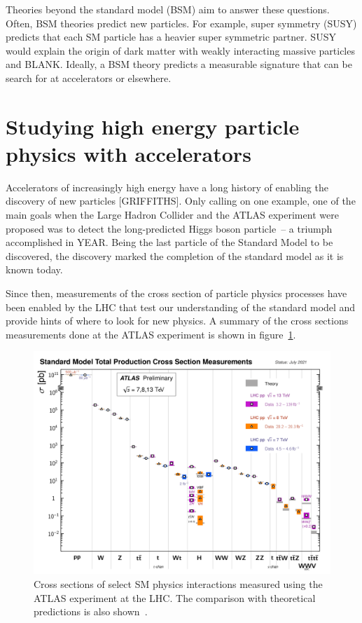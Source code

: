 Theories beyond the standard model (BSM) aim to answer these questions. Often, BSM theories predict new particles. For example, super symmetry (SUSY) predicts that each SM particle has a heavier super symmetric partner. SUSY would explain the origin of dark matter with weakly interacting massive particles and BLANK. Ideally, a BSM theory predicts a measurable signature that can be search for at accelerators or elsewhere.

\section{Studying high energy particle physics with accelerators}

Accelerators of increasingly high energy have a long history of enabling the discovery of new particles [GRIFFITHS]. Only calling on one example, one of the main goals when the Large Hadron Collider and the ATLAS experiment were proposed was to detect the long-predicted Higgs boson particle~-- a triumph accomplished in YEAR. Being the last particle of the Standard Model to be discovered, the discovery marked the completion of the standard model as it is known today.

Since then, measurements of the cross section of particle physics processes have been enabled by the LHC that test our understanding of the standard model and provide hints of where to look for new physics. A summary of the cross sections measurements done at the ATLAS experiment is shown in figure~\ref{fig:atlas_cross_sections}.
\begin{figure}
    \centering
    \includegraphics[width = \textwidth]{figures/atlas_cross_sections.png}
    \caption{Cross sections of select SM physics interactions measured using the ATLAS experiment at the LHC. The comparison with theoretical predictions is also shown~\cite{atlas_public_web_sm}.}
    \label{fig:atlas_cross_sections}
\end{figure}

